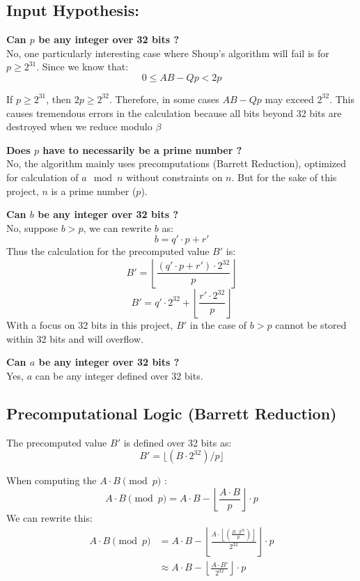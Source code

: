 \documentclass{article}
\begin{document}
\subsection{Input Hypothesis:}
\textbf{Can $p$ be any integer over 32 bits ?} \\
No, one particularly interesting case where Shoup's algorithm will fail is for $p \ge 2^{31}$.
Since we know that:
$$0 \le AB - Qp < 2p$$

If $p \ge 2^{31}$, then $2p \ge 2^{32}$. Therefore, in some cases $AB - Qp$ may exceed $2^{32}$. This causes tremendous errors in the calculation because
all bits beyond 32 bits are destroyed when we reduce modulo $\beta$

\textbf{Does $p$ have to necessarily be a prime number ?} \\
No, the algorithm mainly uses precomputations (Barrett Reduction), optimized for calculation of $a \mod n$ without constraints on $n$.
But for the sake of this project, $n$ is a prime number ($p$).

\textbf{Can $b$ be any integer over 32 bits ?} \\
No, suppose $ b > p $, we can rewrite $b$ as:
\[b = q'\cdot p + r'\]
Thus the calculation for the precomputed value $B'$ is:
\[B' = \left\lfloor\frac{(q' \cdot p + r')\cdot 2^{32}}{p}\right\rfloor\]
\[B' = q' \cdot 2^{32} + \left\lfloor\frac{r'\cdot 2^{32}}{p}\right\rfloor\]
With a focus on 32 bits in this project, $B'$ in the case of $b>p$ cannot be stored within 32 bits and will overflow.

\textbf{Can $a$ be any integer over 32 bits ?} \\
Yes, $a$ can be any integer defined over 32 bits.

\newpage
\subsection{Precomputational Logic (Barrett Reduction)}
The precomputed value $B'$ is defined over 32 bits as:
\[B'= \lfloor (B \cdot 2^{32}) / p \rfloor \]

When computing the $A\cdot B\pmod{p}$ :
\begin{equation*}
    A \cdot B \pmod{p} = A \cdot B -  \left\lfloor \frac{A \cdot B}{p} \right\rfloor \cdot p
\end{equation*}
We can rewrite this:
\begin{align*}
    A \cdot B \pmod{p} & = A \cdot B -  \left\lfloor \frac{A \cdot \left\lfloor (\frac{B \cdot 2^{32}}{p}) \right\rfloor}{2^{32}} \right\rfloor \cdot p \\
                       & \approx A \cdot B -  \left\lfloor \frac{A \cdot B'}{2^{32}} \right\rfloor \cdot p                                              \\
\end{align*}
\end{document}
